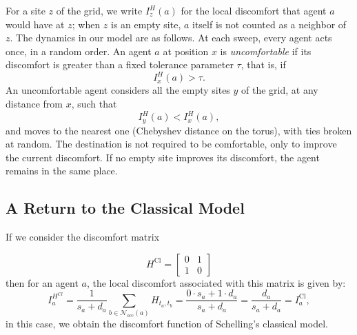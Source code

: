\documentclass{article}
\theoremstyle{remark}
\begin{document}
For a site $z$ of the grid, we write $I_z^H(a)$ for the local discomfort that agent $a$ would have at $z$; when $z$ is an empty site, $a$ itself is not counted as a neighbor of $z$. The dynamics in our model are as follows. At each sweep, every agent acts once, in a random order. An agent $a$ at position $x$ is \emph{uncomfortable} if its discomfort is greater than a fixed tolerance parameter $\tau$, that is, if
\[
I_x^H(a) > \tau.
\]
An uncomfortable agent considers all the empty sites $y$ of the grid, at any distance from $x$, such that
\[
I_y^H(a) < I_x^H(a),
\]
and moves to the nearest one (Chebyshev distance on the torus), with ties broken at random. The destination is not required to be comfortable, only to improve the current discomfort. If no empty site improves its discomfort, the agent remains in the same place.

\subsection{A Return to the Classical Model}

If we consider the discomfort  matrix  

\[
H^{\mathrm{Cl}}=\begin{bmatrix}
0 & 1 \\
1 & 0
\end{bmatrix}
\]
then for an agent $a$, the local discomfort associated with this matrix is given by:
\[
I_a^{H^{Cl}} = \frac{1}{s_a+d_a} \sum_{b \in \mathcal{N}_{\mathrm{occ}}(a)} H_{t_a, t_b}=\frac{0\cdot s_a+1\cdot d_a}{s_a+d_a}=\frac{d_a}{s_a+d_a}=I_a^{\mathrm{Cl}},
\]
in this case, we obtain the discomfort function of Schelling's classical model.
\end{document}
